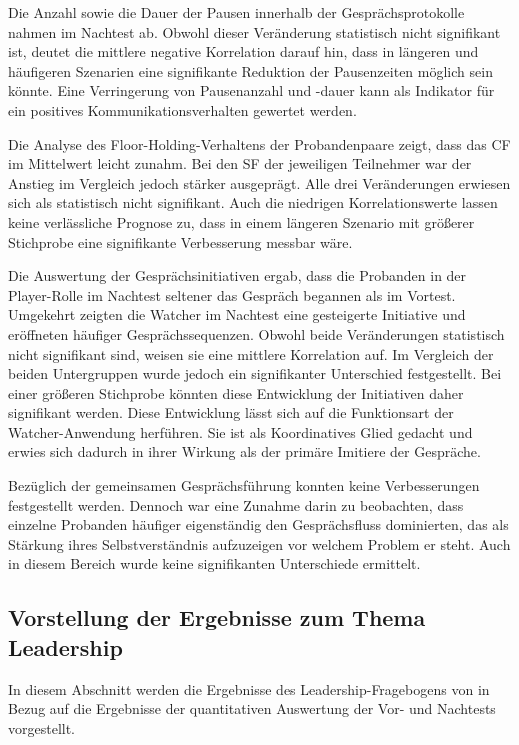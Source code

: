 Die Anzahl sowie die Dauer der Pausen innerhalb der Gesprächsprotokolle nahmen im Nachtest ab. Obwohl dieser Veränderung statistisch nicht signifikant ist, deutet die mittlere negative Korrelation darauf hin, dass in längeren und häufigeren Szenarien eine signifikante Reduktion der Pausenzeiten möglich sein könnte. Eine Verringerung von Pausenanzahl und -dauer kann als Indikator für ein positives Kommunikationsverhalten gewertet werden.

Die Analyse des Floor-Holding-Verhaltens der Probandenpaare zeigt, dass das \ac{CF} im Mittelwert leicht zunahm. Bei den \ac{SF} der jeweiligen Teilnehmer war der Anstieg im Vergleich jedoch stärker ausgeprägt. Alle drei Veränderungen erwiesen sich als statistisch nicht signifikant. Auch die niedrigen Korrelationswerte lassen keine verlässliche Prognose zu, dass in einem längeren Szenario mit größerer Stichprobe eine signifikante Verbesserung messbar wäre.

Die Auswertung der Gesprächsinitiativen ergab, dass die Probanden in der Player-Rolle im Nachtest seltener das Gespräch begannen als im Vortest. Umgekehrt zeigten die Watcher im Nachtest eine gesteigerte Initiative und eröffneten häufiger Gesprächssequenzen. Obwohl beide Veränderungen statistisch nicht signifikant sind, weisen sie eine mittlere Korrelation auf. Im Vergleich der beiden Untergruppen wurde jedoch ein signifikanter Unterschied festgestellt. Bei einer größeren Stichprobe könnten diese Entwicklung der Initiativen daher signifikant werden. Diese Entwicklung lässt sich auf die Funktionsart der Watcher-Anwendung herführen. Sie ist als Koordinatives Glied gedacht und erwies sich dadurch in ihrer Wirkung als der primäre Imitiere der Gespräche.

Bezüglich der gemeinsamen Gesprächsführung konnten keine Verbesserungen festgestellt werden. Dennoch war eine Zunahme darin zu beobachten, dass einzelne Probanden häufiger eigenständig den Gesprächsfluss dominierten, das als Stärkung ihres Selbstverständnis aufzuzeigen vor welchem Problem er steht. Auch in diesem Bereich wurde keine signifikanten Unterschiede ermittelt.


\subsection{Vorstellung der Ergebnisse zum Thema Leadership}
In diesem Abschnitt werden die Ergebnisse des Leadership-Fragebogens von \cite{emmerich_game_2016} in Bezug auf die Ergebnisse der quantitativen Auswertung der Vor- und Nachtests vorgestellt.

